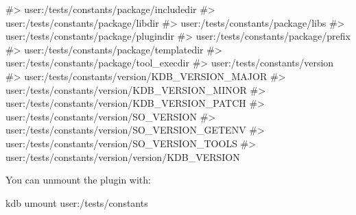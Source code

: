 \begin{DoxyCode}
#> user:/tests/constants/package/includedir
#> user:/tests/constants/package/libdir
#> user:/tests/constants/package/libs
#> user:/tests/constants/package/plugindir
#> user:/tests/constants/package/prefix
#> user:/tests/constants/package/templatedir
#> user:/tests/constants/package/tool\_execdir
#> user:/tests/constants/version
#> user:/tests/constants/version/KDB\_VERSION\_MAJOR
#> user:/tests/constants/version/KDB\_VERSION\_MINOR
#> user:/tests/constants/version/KDB\_VERSION\_PATCH
#> user:/tests/constants/version/SO\_VERSION
#> user:/tests/constants/version/SO\_VERSION\_GETENV
#> user:/tests/constants/version/SO\_VERSION\_TOOLS
#> user:/tests/constants/version/version/KDB\_VERSION
\end{DoxyCode}


You can unmount the plugin with\+:


\begin{DoxyCode}
kdb umount user:/tests/constants
\end{DoxyCode}
 